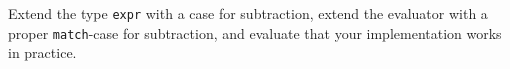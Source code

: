 Extend the type \lstinline{expr} with a case for subtraction, extend
the evaluator with a proper \lstinline{match}-case for subtraction, and
evaluate that your implementation works in practice.
